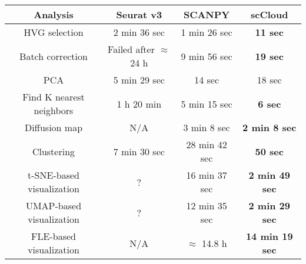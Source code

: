 \documentclass[10pt]{article}
\begin{document}
\begin{table}[H]
	\centering
	\begin{tabular}{|c|c|c|c|}
		\hline
		Analysis & Seurat v3 & SCANPY & scCloud\\
		\hline \hline
		HVG selection & 2 min 36 sec & 1 min 26 sec & \textbf{11 sec} \\
		\hline
		Batch correction & Failed after $\approx$ 24 h & 9 min 56 sec & \textbf{19 sec} \\
		\hline
		PCA & 5 min 29 sec & 14 sec & 18 sec \\
		\hline
		Find K nearest neighbors &  1 h 20 min &  5 min 15 sec & \textbf{6 sec}\\
		\hline
		Diffusion map & N/A & 3 min 8 sec & \textbf{2 min 8 sec} \\
		\hline 
		Clustering & 7 min 30 sec & 28 min 42 sec & \textbf{50 sec}\\
		\hline
		t-SNE-based visualization & ? & 16 min 37 sec & \textbf{2 min 49 sec}\\
		\hline
		UMAP-based visualization & ? & 12 min 35 sec & \textbf{2 min 29 sec}\\
		\hline
		FLE-based visualization & N/A & $\approx$ 14.8  h & \textbf{14 min 19 sec}\\
		\hline
	\end{tabular}
\end{table}
\end{document}
